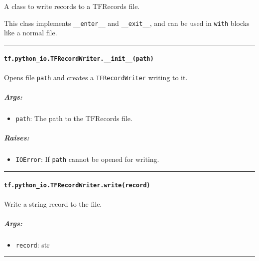A class to write records to a TFRecords file.

This class implements \texttt{\_\_enter\_\_} and \texttt{\_\_exit\_\_},
and can be used in \texttt{with} blocks like a normal file.

\begin{center}\rule{0.5\linewidth}{\linethickness}\end{center}

\paragraph{\texorpdfstring{\texttt{tf.python\_io.TFRecordWriter.\_\_init\_\_(path)}
}{tf.python\_io.TFRecordWriter.\_\_init\_\_(path) }}\label{tf.pythonux5fio.tfrecordwriter.ux5fux5finitux5fux5fpath}

Opens file \texttt{path} and creates a \texttt{TFRecordWriter} writing
to it.

\subparagraph{Args: }\label{args}

\begin{itemize}
\tightlist
\item
  \texttt{path}: The path to the TFRecords file.
\end{itemize}

\subparagraph{Raises: }\label{raises}

\begin{itemize}
\tightlist
\item
  \texttt{IOError}: If \texttt{path} cannot be opened for writing.
\end{itemize}

\begin{center}\rule{0.5\linewidth}{\linethickness}\end{center}

\paragraph{\texorpdfstring{\texttt{tf.python\_io.TFRecordWriter.write(record)}
}{tf.python\_io.TFRecordWriter.write(record) }}\label{tf.pythonux5fio.tfrecordwriter.writerecord}

Write a string record to the file.

\subparagraph{Args: }\label{args-1}

\begin{itemize}
\tightlist
\item
  \texttt{record}: str
\end{itemize}

\begin{center}\rule{0.5\linewidth}{\linethickness}\end{center}


